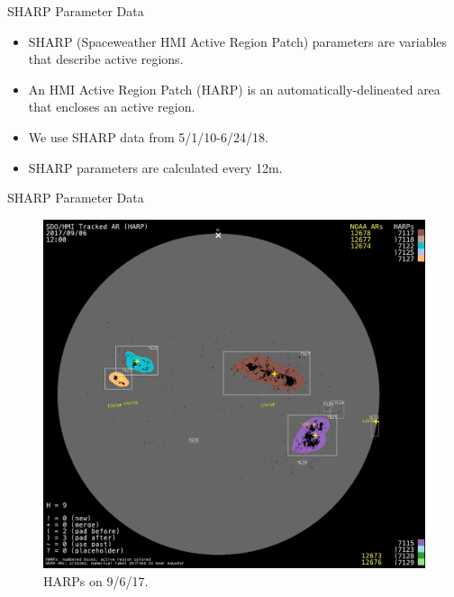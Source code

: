 \documentclass{beamer}
\begin{document}
\begin{frame}{SHARP Parameter Data}
    \begin{itemize}
        \item SHARP (Spaceweather HMI Active Region Patch) parameters are variables that describe active regions.
        \item An HMI Active Region Patch (HARP) is an automatically-delineated area that encloses an active region.
        \item We use SHARP data from 5/1/10-6/24/18.
        \item SHARP parameters are calculated every 12m.
    \end{itemize}
\end{frame}

\begin{frame}{SHARP Parameter Data}
    \begin{figure}
        \centering
        \includegraphics[scale=0.19]{magnetogram_20170906.png}
        \caption{HARPs on 9/6/17.}
        \label{fig:magnetogram_20170906}
    \end{figure}
\end{frame}
\end{document}
